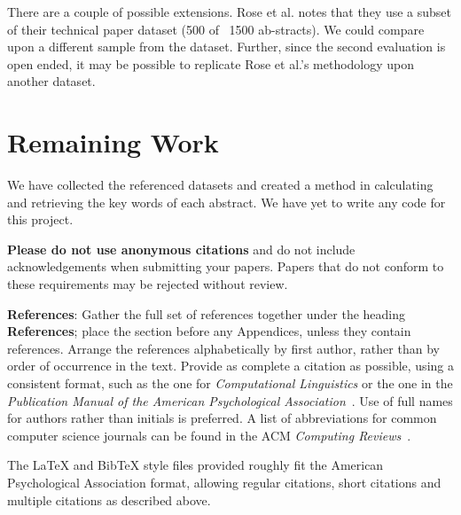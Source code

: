 \documentclass[11pt,a4paper]{article}
\begin{document}
There are a couple of possible extensions. Rose et al. notes that they use a subset of their technical paper dataset (500 of ~1500 ab-stracts).  We could compare upon a different sample from the dataset. Further, since the second evaluation is open ended, it may be possible to replicate Rose et al.’s methodology upon another dataset.


\section{Remaining Work}

We have collected the referenced datasets and created a method in calculating and retrieving the key words of each abstract. We have yet to write any code for this project.

\textbf{Please do not use anonymous citations} and do not include
acknowledgements when submitting your papers. Papers that do not
conform to these requirements may be rejected without review.

\textbf{References}: Gather the full set of references together under
the heading {\bf References}; place the section before any Appendices,
unless they contain references. Arrange the references alphabetically
by first author, rather than by order of occurrence in the text.
Provide as complete a citation as possible, using a consistent format,
such as the one for {\em Computational Linguistics\/} or the one in the 
{\em Publication Manual of the American 
Psychological Association\/}~\cite{APA:83}.  Use of full names for
authors rather than initials is preferred.  A list of abbreviations
for common computer science journals can be found in the ACM 
{\em Computing Reviews\/}~\cite{ACM:83}.

The \LaTeX{} and Bib\TeX{} style files provided roughly fit the
American Psychological Association format, allowing regular citations, 
short citations and multiple citations as described above.

%
%



\appendix
\end{document}
